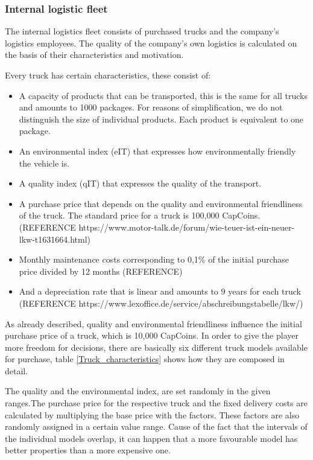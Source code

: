 \subsubsection{Internal logistic fleet}
The internal logistics fleet consists of purchased trucks and the company's logistics employees. The quality of the company's own logistics is calculated on the basis of their characteristics and motivation.

Every truck has certain characteristics, these consist of:
\begin{itemize}
    \item A capacity of products that can be transported, this is the same for all trucks and amounts to 1000 packages. For reasons of simplification, we do not distinguish the size of individual products.  Each product is equivalent to one package. 
    \item An environmental index (\gls{eIT}) that expresses how environmentally friendly the vehicle is.
    \item A quality index (\gls{qIT}) that expresses the quality of the transport.
    \item A purchase price that depends on the quality and environmental friendliness of the truck. The standard price for a truck is 100,000 CapCoins. (REFERENCE https://www.motor-talk.de/forum/wie-teuer-ist-ein-neuer-lkw-t1631664.html)
    \item Monthly maintenance costs corresponding to 0,1\% of the initial purchase price divided by 12 months (REFERENCE)
    \item And a depreciation rate that is linear and amounts to 9 years for each truck (REFERENCE https://www.lexoffice.de/service/abschreibungstabelle/lkw/) 
\end{itemize}

As already described, quality and environmental friendliness influence the initial purchase price of a truck, which is 10,000 CapCoins. In order to give the player more freedom for decisions, there are basically six different truck models available for purchase, table \ref{Truck_characteristics} shows how they are composed in detail. 

The quality and the environmental index, are set randomly in the given ranges.The purchase price for the respective truck and the fixed delivery costs are calculated by multiplying the base price with the factors. These factors are also randomly assigned in a certain value range. Cause of the fact that the intervals of the individual models overlap, it can happen that a more favourable model has better properties than a more expensive one.


